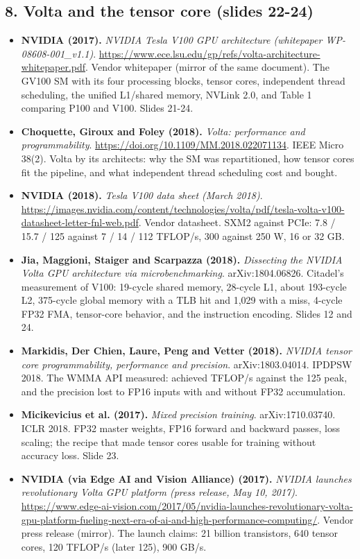 \subsection*{8. Volta and the tensor core (slides 22-24)}
\begin{itemize}[leftmargin=1.2em,itemsep=3pt]\sloppy
\item \textbf{NVIDIA (2017).} \textit{NVIDIA Tesla V100 GPU architecture (whitepaper WP-08608-001\_v1.1)}. \url{https://www.ece.lsu.edu/gp/refs/volta-architecture-whitepaper.pdf}. Vendor whitepaper (mirror of the same document). The GV100 SM with its four processing blocks, tensor cores, independent thread scheduling, the unified L1/shared memory, NVLink 2.0, and Table 1 comparing P100 and V100. Slides 21-24.
\item \textbf{Choquette, Giroux and Foley (2018).} \textit{Volta: performance and programmability}. \url{https://doi.org/10.1109/MM.2018.022071134}. IEEE Micro 38(2). Volta by its architects: why the SM was repartitioned, how tensor cores fit the pipeline, and what independent thread scheduling cost and bought.
\item \textbf{NVIDIA (2018).} \textit{Tesla V100 data sheet (March 2018)}. \url{https://images.nvidia.com/content/technologies/volta/pdf/tesla-volta-v100-datasheet-letter-fnl-web.pdf}. Vendor datasheet. SXM2 against PCIe: 7.8 / 15.7 / 125 against 7 / 14 / 112 TFLOP/s, 300 against 250 W, 16 or 32 GB.
\item \textbf{Jia, Maggioni, Staiger and Scarpazza (2018).} \textit{Dissecting the NVIDIA Volta GPU architecture via microbenchmarking}. arXiv:1804.06826. Citadel's measurement of V100: 19-cycle shared memory, 28-cycle L1, about 193-cycle L2, 375-cycle global memory with a TLB hit and 1,029 with a miss, 4-cycle FP32 FMA, tensor-core behavior, and the instruction encoding. Slides 12 and 24.
\item \textbf{Markidis, Der Chien, Laure, Peng and Vetter (2018).} \textit{NVIDIA tensor core programmability, performance and precision}. arXiv:1803.04014. IPDPSW 2018. The WMMA API measured: achieved TFLOP/s against the 125 peak, and the precision lost to FP16 inputs with and without FP32 accumulation.
\item \textbf{Micikevicius et al. (2017).} \textit{Mixed precision training}. arXiv:1710.03740. ICLR 2018. FP32 master weights, FP16 forward and backward passes, loss scaling; the recipe that made tensor cores usable for training without accuracy loss. Slide 23.
\item \textbf{NVIDIA (via Edge AI and Vision Alliance) (2017).} \textit{NVIDIA launches revolutionary Volta GPU platform (press release, May 10, 2017)}. \url{https://www.edge-ai-vision.com/2017/05/nvidia-launches-revolutionary-volta-gpu-platform-fueling-next-era-of-ai-and-high-performance-computing/}. Vendor press release (mirror). The launch claims: 21 billion transistors, 640 tensor cores, 120 TFLOP/s (later 125), 900 GB/s.
\end{itemize}
